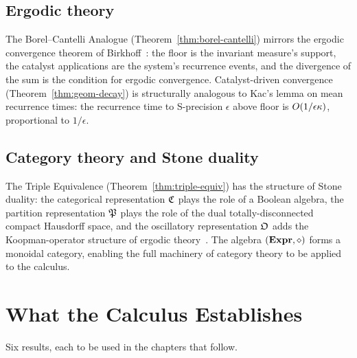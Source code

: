 \subsection*{Ergodic theory}
The Borel--Cantelli Analogue (Theorem~\ref{thm:borel-cantelli}) mirrors the ergodic convergence theorem of Birkhoff~\citep{birkhoff1931}: the floor is the invariant measure's support, the catalyst applications are the system's recurrence events, and the divergence of the sum is the condition for ergodic convergence. Catalyst-driven convergence (Theorem~\ref{thm:geom-decay}) is structurally analogous to Kac's lemma on mean recurrence times: the recurrence time to S-precision $\epsilon$ above floor is $O(1/\epsilon \kappa)$, proportional to $1/\epsilon$.

\subsection*{Category theory and Stone duality}
The Triple Equivalence (Theorem~\ref{thm:triple-equiv}) has the structure of Stone duality: the categorical representation $\mathfrak{C}$ plays the role of a Boolean algebra, the partition representation $\mathfrak{P}$ plays the role of the dual totally-disconnected compact Hausdorff space, and the oscillatory representation $\mathfrak{O}$ adds the Koopman-operator structure of ergodic theory~\citep{maclane1998}. The algebra $(\mathbf{Expr}, \diamond)$ forms a monoidal category, enabling the full machinery of category theory to be applied to the calculus.


\section{What the Calculus Establishes}
\label{sec:ch1-summary}

Six results, each to be used in the chapters that follow.

